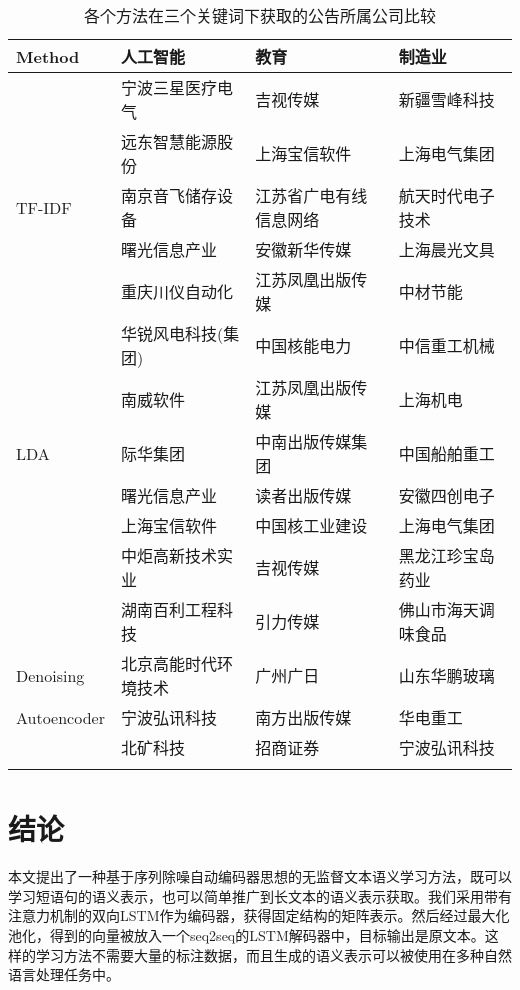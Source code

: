\documentclass[UTF8,11pt,a4paper,nofonts]{ctexart}
\begin{document}
\begin{longtable}{|p{5 em}|l|l|l|}
\hline
Method & 人工智能 & 教育 & 制造业 \\
\hline
 & 宁波三星医疗电气 & 吉视传媒 & 新疆雪峰科技 \\ 
 & 远东智慧能源股份 & 上海宝信软件 &  上海电气集团\\ 
TF-IDF & 南京音飞储存设备 & 江苏省广电有线信息网络 & 航天时代电子技术 \\ 
 & 曙光信息产业 & 安徽新华传媒 & 上海晨光文具 \\  
 & 重庆川仪自动化 & 江苏凤凰出版传媒 & 中材节能 \\ 
\hline
 & 华锐风电科技(集团) & 中国核能电力 & 中信重工机械 \\ 
 & 南威软件 & 江苏凤凰出版传媒 & 上海机电 \\ 
LDA & 际华集团 & 中南出版传媒集团 & 中国船舶重工 \\ 
 & 曙光信息产业 & 读者出版传媒 & 安徽四创电子 \\  
 & 上海宝信软件 & 中国核工业建设 & 上海电气集团 \\ 
\hline
 & 中炬高新技术实业 & 吉视传媒 & 黑龙江珍宝岛药业 \\ 
 & 湖南百利工程科技 & 引力传媒 & 佛山市海天调味食品 \\ 
Denoising & 北京高能时代环境技术 & 广州广日 & 山东华鹏玻璃 \\ 
Autoencoder & 宁波弘讯科技 & 南方出版传媒 & 华电重工 \\  
 & 北矿科技 & 招商证券 & 宁波弘讯科技 \\ 
\hline
\caption{各个方法在三个关键词下获取的公告所属公司比较}\label{tbl:01}
\end{longtable}




\section{结论}

本文提出了一种基于序列除噪自动编码器思想的无监督文本语义学习方法，既可以学习短语句的语义表示，也可以简单推广到长文本的语义表示获取。我们采用带有注意力机制的双向LSTM作为编码器，获得固定结构的矩阵表示。然后经过最大化池化，得到的向量被放入一个seq2seq的LSTM解码器中，目标输出是原文本。这样的学习方法不需要大量的标注数据，而且生成的语义表示可以被使用在多种自然语言处理任务中。
\end{document}
